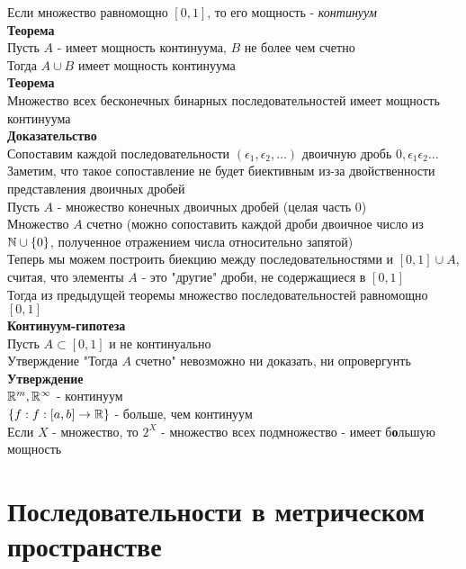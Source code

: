 \documentclass[12pt]{article}
\begin{document}
Если множество равномощно $[0, 1]$, то его мощность - \textit{континуум}\\
\textbf{Теорема}\\
Пусть $A$ - имеет мощность континуума, $B$ не более чем счетно\\
Тогда $A \cup B$ имеет мощность континуума\\
\textbf{Теорема}\\
Множество всех бесконечных бинарных последовательностей имеет мощность континуума\\
\textbf{Доказательство}\\
Сопоставим каждой последовательности $(\epsilon_1, \epsilon_2, \ldots)$ двоичную дробь $0,\epsilon_1\epsilon_2\ldots$\\
Заметим, что такое сопоставление не будет биективным из-за двойственности представления двоичных дробей\\
Пусть $A$ - множество конечных двоичных дробей (целая часть 0)\\
Множество $A$ счетно (можно сопоставить каждой дроби двоичное число из $\mathbb{N}\cup\{0\}$, полученное отражением числа относительно запятой)\\
Теперь мы можем построить биекцию между последовательностями и $[0, 1] \cup A$, считая, что элементы $A$ - это "другие" дроби, не содержащиеся в $[0,1]$\\
Тогда из предыдущей теоремы множество последовательностей равномощно $[0,1]$\\
\textbf{Континуум-гипотеза}\\
Пусть $A\subset [0,1]$ и не континуально\\
Утверждение "Тогда $A$ счетно" невозможно ни доказать, ни опровергунть\\
\textbf{Утверждение}\\
$\mathbb{R}^m, \mathbb{R}^\infty$ - континуум\\
$\{f: f:[a,b] \rightarrow \mathbb{R}\}$ - больше, чем континуум\\
Если $X$ - множество, то $2^X$ - множество всех подмножество - имеет б\textbf{о}льшую мощность\\
\section{Последовательности в метрическом пространстве}
\end{document}
